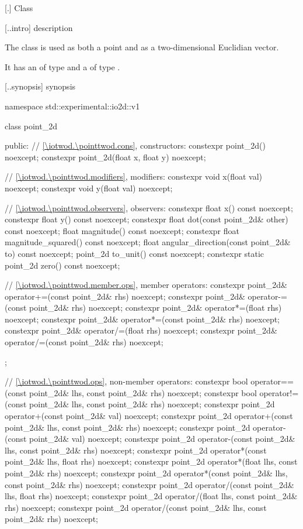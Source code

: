  [\iotwod.\pointtwod] {Class }

 [\iotwod.\pointtwod.intro] { description}

%
\pnum
The class  is used as both a point and as a two-dimensional Euclidian vector.

\pnum
It has an  of type  and a  of type .

 [\iotwod.\pointtwod.synopsis] { synopsis}

\begin{codeblock}
namespace std::experimental::io2d::v1 {
  class point_2d {
  public:
    // \ref{\iotwod.\pointtwod.cons}, constructors:
    constexpr point_2d() noexcept;
    constexpr point_2d(float x, float y) noexcept;

    // \ref{\iotwod.\pointtwod.modifiers}, modifiers:
    constexpr void x(float val) noexcept;
    constexpr void y(float val) noexcept;
    
    // \ref{\iotwod.\pointtwod.observers}, observers:
    constexpr float x() const noexcept;
    constexpr float y() const noexcept;
    constexpr float dot(const point_2d& other) const noexcept;
    float magnitude() const noexcept;
    constexpr float magnitude_squared() const noexcept;
    float angular_direction(const point_2d& to) const noexcept;
    point_2d to_unit() const noexcept;
    constexpr static point_2d zero() const noexcept;
    
    // \ref{\iotwod.\pointtwod.member.ops}, member operators:
    constexpr point_2d& operator+=(const point_2d& rhs) noexcept;
    constexpr point_2d& operator-=(const point_2d& rhs) noexcept;
    constexpr point_2d& operator*=(float rhs) noexcept;
    constexpr point_2d& operator*=(const point_2d& rhs) noexcept;
    constexpr point_2d& operator/=(float rhs) noexcept;
    constexpr point_2d& operator/=(const point_2d& rhs) noexcept;
  };
  
  // \ref{\iotwod.\pointtwod.ops}, non-member operators:
  constexpr bool operator==(const point_2d& lhs, const point_2d& rhs)
    noexcept;
  constexpr bool operator!=(const point_2d& lhs, const point_2d& rhs)
    noexcept;
  constexpr point_2d operator+(const point_2d& val) noexcept;
  constexpr point_2d operator+(const point_2d& lhs, const point_2d& rhs)
    noexcept;
  constexpr point_2d operator-(const point_2d& val) noexcept;
  constexpr point_2d operator-(const point_2d& lhs, const point_2d& rhs)
    noexcept;
  constexpr point_2d operator*(const point_2d& lhs, float rhs) noexcept;
  constexpr point_2d operator*(float lhs, const point_2d& rhs) noexcept;
  constexpr point_2d operator*(const point_2d& lhs, const point_2d& rhs)
    noexcept;
  constexpr point_2d operator/(const point_2d& lhs, float rhs) noexcept;
  constexpr point_2d operator/(float lhs, const point_2d& rhs) noexcept;
  constexpr point_2d operator/(const point_2d& lhs, const point_2d& rhs)
    noexcept;
}
\end{codeblock}

